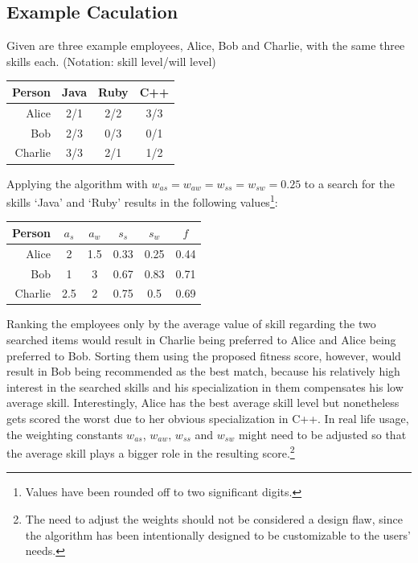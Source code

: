 \subsection{Example Caculation}
Given are three example employees, Alice, Bob and Charlie, with the same three skills each.
(Notation: skill level/will level)
\newline
\newline
\begin{center}
\begin{tabular}{r|ccc}
  Person  & Java & Ruby & C++ \\
  \hline
  Alice   & 2/1  & 2/2 & 3/3 \\
  Bob     & 2/3  & 0/3 & 0/1 \\
  Charlie & 3/3  & 2/1 & 1/2 \\
\end{tabular}
\end{center}

Applying the algorithm with $w_{as} = w_{aw} = w_{ss} = w_{sw} = 0.25$ to a search for the skills `Java' and `Ruby' results in the following values\footnote{Values have been rounded off to two significant digits.}:


\begin{center}
\begin{tabular}{r|ccccc}
  Person  & $a_s$ & $a_w$ & $s_s$ & $s_w$ & $f$\\
  \hline
  Alice   & 2   & 1.5 & 0.33 & 0.25 & 0.44\\
  Bob     & 1   & 3   & 0.67 & 0.83 & 0.71\\
  Charlie & 2.5 & 2   & 0.75 & 0.5  & 0.69\\
\end{tabular}
\end{center}

Ranking the employees only by the average value of skill regarding the two searched items would result in Charlie being preferred to Alice and Alice being preferred to Bob. Sorting them using the proposed fitness score, however, would result in Bob being recommended as the best match, because his relatively high interest in the searched skills and his specialization in them compensates his low average skill. Interestingly, Alice has the best average skill level but nonetheless gets scored the worst due to her obvious specialization in C++. In real life usage, the weighting constants $w_{as}$, $w_{aw}$, $w_{ss}$ and $ w_{sw}$ might need to be adjusted so that the average skill plays a bigger role in the resulting score.\footnote{The need to adjust the weights should not be considered a design flaw, since the algorithm has been intentionally designed to be customizable to the users' needs.}

